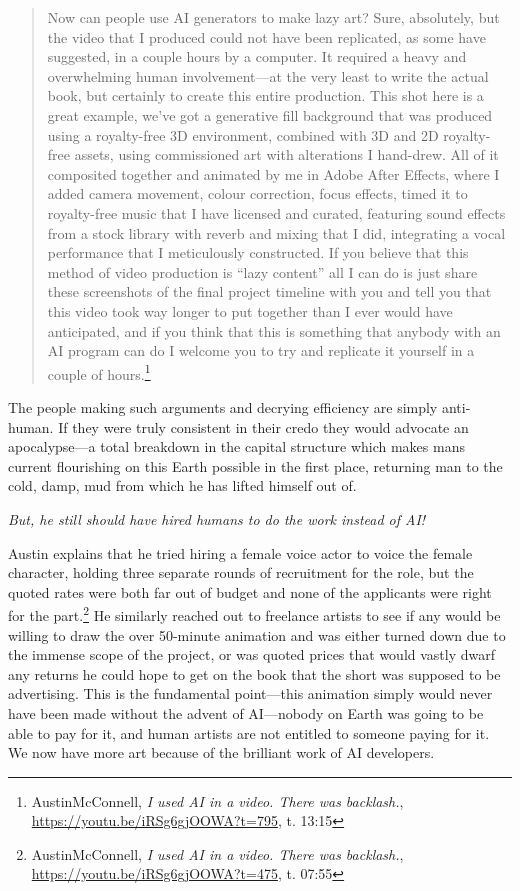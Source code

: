 \documentclass[11pt]{article}
\begin{document}
\begin{quote}
Now can people use AI generators to make lazy art? Sure, absolutely, but the video that I produced could not have been replicated, as some have suggested, in a couple hours by a computer. It required a heavy and overwhelming human involvement---at the very least to write the actual book, but certainly to create this entire production. This shot here is a great example, we've got a generative fill background that was produced using a royalty-free 3D environment, combined with 3D and 2D royalty-free assets, using commissioned art with alterations I hand-drew. All of it composited together and animated by me in Adobe After Effects, where I added camera movement, colour correction, focus effects, timed it to royalty-free music that I have licensed and curated, featuring sound effects from a stock library with reverb and mixing that I did, integrating a vocal performance that I meticulously constructed. If you believe that this method of video production is ``lazy content'' all I can do is just share these screenshots of the final project timeline with you and tell you that this video took way longer to put together than I ever would have anticipated, and if you think that this is something that anybody with an AI program can do I welcome you to try and replicate it yourself in a couple of hours.\footnote{AustinMcConnell, \emph{I used AI in a video. There was backlash.}, \url{https://youtu.be/iRSg6gjOOWA?t=795}, t. 13:15}
\end{quote}

The people making such arguments and decrying efficiency are simply anti-human. If they were truly consistent in their credo they would advocate an apocalypse---a total breakdown in the capital structure which makes mans current flourishing on this Earth possible in the first place, returning man to the cold, damp, mud from which he has lifted himself out of.

\emph{But, he still should have hired humans to do the work instead of AI!}

Austin explains that he tried hiring a female voice actor to voice the female character, holding three separate rounds of recruitment for the role, but the quoted rates were both far out of budget and none of the applicants were right for the part.\footnote{AustinMcConnell, \emph{I used AI in a video. There was backlash.}, \url{https://youtu.be/iRSg6gjOOWA?t=475}, t. 07:55} He similarly reached out to freelance artists to see if any would be willing to draw the over 50-minute animation and was either turned down due to the immense scope of the project, or was quoted prices that would vastly dwarf any returns he could hope to get on the book that the short was supposed to be advertising. This is the fundamental point---this animation simply would never have been made without the advent of AI---nobody on Earth was going to be able to pay for it, and human artists are not entitled to someone paying for it. We now have more art because of the brilliant work of AI developers.
\end{document}
